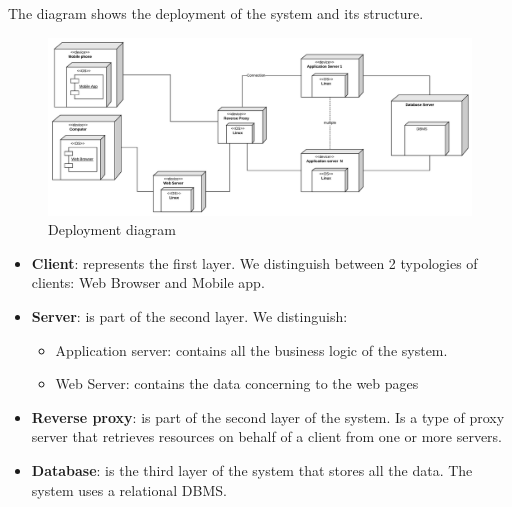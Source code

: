 The diagram shows the deployment of the system and its structure.

\begin{figure}[H]
	\includegraphics[width=\textwidth,height=\textheight,keepaspectratio]{assets/DeploymentDiagram.pdf}
	\caption{Deployment diagram}
	\label{fig:DD}
\end{figure}

\begin{itemize}
    \item \textbf{Client}: represents the first layer. We distinguish between 2 typologies of clients: Web Browser and Mobile app.
    \item \textbf{Server}: is part of the second layer. 
    We distinguish:
    \begin{itemize}
        \item Application server: contains all the business logic of the system.
        \item Web Server: contains the data concerning to the web pages
    \end{itemize}
    \item \textbf{Reverse proxy}: is part of the second layer of the system.
    Is a type of proxy server that retrieves resources on behalf of a client from one or more servers.
    \item \textbf{Database}: is the third layer of the system that stores all the data. 
    The system uses a relational DBMS.
\end{itemize}
